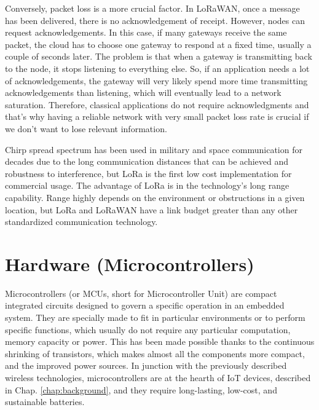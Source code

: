			Conversely, packet loss is a more crucial factor. In LoRaWAN, once a message has been delivered, there is no
			acknowledgement of receipt. However, nodes can request
			acknowledgements. In this case, if many gateways receive the
			same packet, the cloud has to choose one gateway to respond
			at a ﬁxed time, usually a couple of seconds later. The problem
			is that when a gateway is transmitting back to the node, it stops
			listening to everything else. So, if an application needs a lot of
			acknowledgements, the gateway will very likely spend more
			time transmitting acknowledgements than listening, which will
			eventually lead to a network saturation. Therefore, classical
			applications do not require acknowledgments and that’s why
			having a reliable network with very small packet loss rate is
			crucial if we don’t want to lose relevant information.
			
			Chirp spread spectrum has been used in
			military and space communication for decades due to the long
			communication distances that can be achieved and robustness
			to interference, but LoRa is the ﬁrst low cost implementation
			for commercial usage. The advantage of LoRa is in the
			technology’s long range capability. Range highly depends on
			the environment or obstructions in a given location, but LoRa
			and LoRaWAN have a link budget greater than any other
			standardized communication technology.
			
	\section{Hardware (Microcontrollers)}\label{sec:microcontrollers}
	
	
		Microcontrollers (or MCUs, short for Microcontroller Unit) are compact integrated circuits designed to govern a specific operation in an embedded system.
		They are specially made to fit in particular environments or to perform specific functions, which usually do not require any particular computation, memory capacity or power.
		This has been made possible thanks to the continuous shrinking of transistors, which makes almost all the components more compact, and the improved power sources.
		In junction with the previously described wireless technologies, microcontrollers are at the hearth of IoT devices, described in Chap. \ref{chap:background}, and they require long-lasting, low-cost, and sustainable batteries.
		

